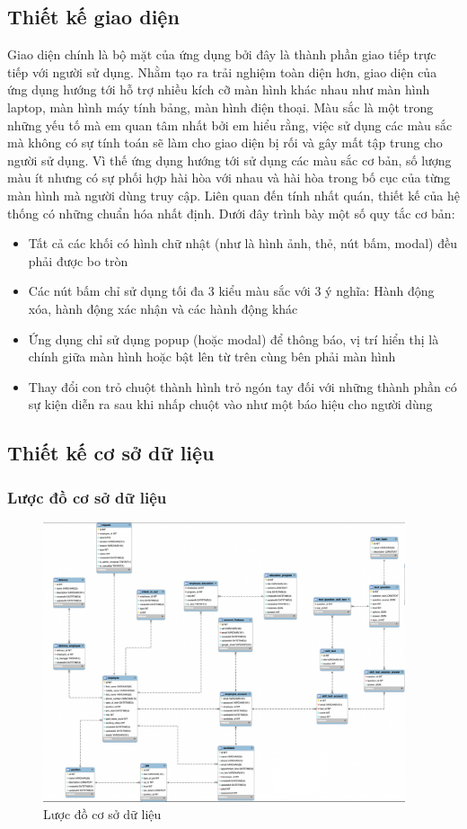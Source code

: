 \documentclass[../DoAn.tex]{subfiles}
\begin{document}
\subsection{Thiết kế giao diện}
Giao diện chính là bộ mặt của ứng dụng bởi đây là thành phần giao tiếp trực tiếp với người sử dụng. Nhằm tạo ra trải nghiệm toàn diện hơn, giao diện của ứng dụng hướng tới hỗ trợ nhiều kích cỡ màn hình khác nhau như màn hình laptop, màn hình máy tính bảng, màn hình điện thoại. Màu sắc là một trong những yếu tố mà em quan tâm nhất bởi em hiểu rằng, việc sử dụng các màu sắc mà không có sự tính toán sẽ làm cho giao diện bị rối và gây mất tập trung cho người sử dụng. Vì thế ứng dụng hướng tới sử dụng các màu sắc cơ bản, số lượng màu ít nhưng có sự phối hợp hài hòa với nhau và hài hòa trong bố cục của từng màn hình mà người dùng truy cập. Liên quan đến tính nhất quán, thiết kế của hệ thống có những chuẩn hóa nhất định. Dưới đây trình bày một số quy tắc cơ bản:
\begin{itemize}
    \item Tất cả các khối có hình chữ nhật (như là hình ảnh, thẻ, nút bấm, modal) đều phải được bo tròn
    \item Các nút bấm chỉ sử dụng tối đa 3 kiểu màu sắc với 3 ý nghĩa: Hành động xóa, hành động xác nhận và các hành động khác
    \item Ứng dụng chỉ sử dụng popup (hoặc modal) để thông báo, vị trí hiển thị là chính giữa màn hình hoặc bật lên từ trên cùng bên phải màn hình
    \item Thay đổi con trỏ chuột thành hình trỏ ngón tay đối với những thành phần có sự kiện diễn ra sau khi nhấp chuột vào như một báo hiệu cho người dùng
\end{itemize}

\subsection{Thiết kế cơ sở dữ liệu}
\subsubsection{Lược đồ cơ sở dữ liệu}
\begin{figure}[H]
    \centering
    \includegraphics[width=0.95\textwidth]{Hinhve/LuocDoERD.png}
    \caption{Lược đồ cơ sở dữ liệu}
\end{figure}
\end{document}
